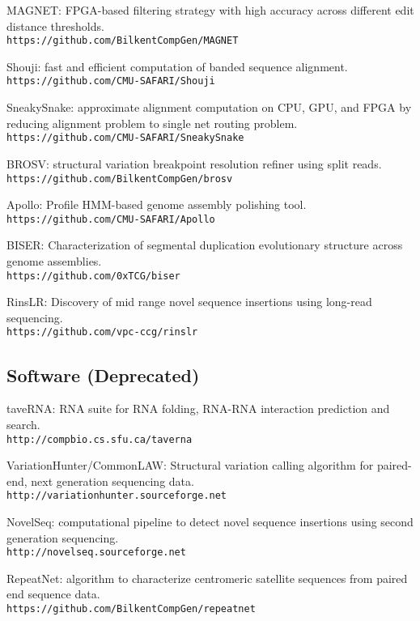 \begin{list2}
\item
  MAGNET: FPGA-based filtering strategy with high accuracy across different edit distance thresholds.\\
  {\tt https://github.com/BilkentCompGen/MAGNET}

  
\item
  Shouji: fast and efficient computation of banded sequence alignment.\\
  {\tt https://github.com/CMU-SAFARI/Shouji}
\item
  SneakySnake: approximate alignment computation on CPU, GPU, and FPGA by reducing alignment problem to single net routing problem.
  {\tt https://github.com/CMU-SAFARI/SneakySnake}
\item
  BROSV: structural variation breakpoint resolution refiner using split reads.\\
  {\tt https://github.com/BilkentCompGen/brosv}
  \item
  Apollo: Profile HMM-based genome assembly polishing tool.
  {\tt https://github.com/CMU-SAFARI/Apollo}
  \item
  BISER: Characterization of segmental duplication evolutionary structure across  genome assemblies.\\
  {\tt https://github.com/0xTCG/biser}
  \item
  RinsLR: Discovery of mid range novel sequence insertions using long-read sequencing.\\
  {\tt https://github.com/vpc-ccg/rinslr}

\end{list2}

\subsection{\small \sc Software (Deprecated)}
\begin{list2}
\item
  taveRNA: RNA suite for RNA folding, RNA-RNA interaction prediction and search. \\
  {\tt http://compbio.cs.sfu.ca/taverna}
\item
  VariationHunter/CommonLAW: Structural variation calling algorithm for paired-end, next
  generation sequencing data.
  {\tt http://variationhunter.sourceforge.net}
\item
  NovelSeq: computational pipeline to detect novel sequence insertions using second generation sequencing.\\
  {\tt http://novelseq.sourceforge.net}
\item
  RepeatNet: algorithm to characterize centromeric satellite sequences from paired end sequence data.\\
  {\tt https://github.com/BilkentCompGen/repeatnet}
\end{list2}







